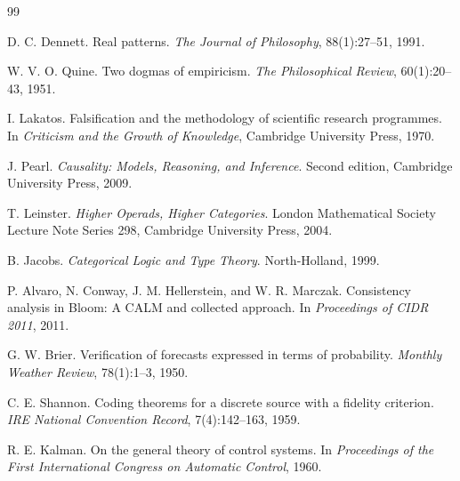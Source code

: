 \begin{thebibliography}{99}

D. C. Dennett.
\newblock Real patterns.
\newblock \emph{The Journal of Philosophy}, 88(1):27--51, 1991.

W. V. O. Quine.
\newblock Two dogmas of empiricism.
\newblock \emph{The Philosophical Review}, 60(1):20--43, 1951.

I. Lakatos.
\newblock Falsification and the methodology of scientific research programmes.
\newblock In \emph{Criticism and the Growth of Knowledge}, Cambridge University Press,
1970.

J. Pearl.
\newblock \emph{Causality: Models, Reasoning, and Inference}.
\newblock Second edition, Cambridge University Press, 2009.


T. Leinster.
\newblock \emph{Higher Operads, Higher Categories}.
\newblock London Mathematical Society Lecture Note Series 298, Cambridge University
Press, 2004.

B. Jacobs.
\newblock \emph{Categorical Logic and Type Theory}.
\newblock North-Holland, 1999.

P. Alvaro, N. Conway, J. M. Hellerstein, and W. R. Marczak.
\newblock Consistency analysis in Bloom: A CALM and collected approach.
\newblock In \emph{Proceedings of CIDR 2011}, 2011.

G. W. Brier.
\newblock Verification of forecasts expressed in terms of probability.
\newblock \emph{Monthly Weather Review}, 78(1):1--3, 1950.

C. E. Shannon.
\newblock Coding theorems for a discrete source with a fidelity criterion.
\newblock \emph{IRE National Convention Record}, 7(4):142--163, 1959.

R. E. Kalman.
\newblock On the general theory of control systems.
\newblock In \emph{Proceedings of the First International Congress on Automatic
Control}, 1960.



\end{thebibliography}
